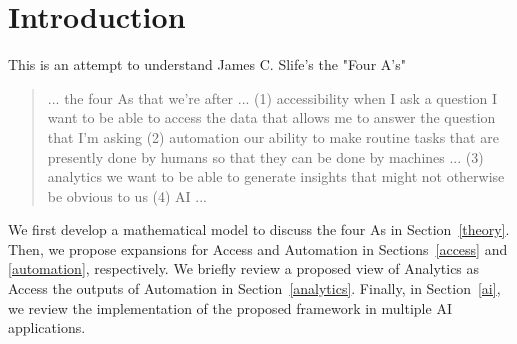 \section{Introduction}\label{intro}

This is an attempt to understand James C. Slife's the "Four A's"~\cite{Slife24}
%
\begin{quote}
... the four As that we're after ... (1) accessibility when I ask a question I want to be able to access the data that allows me to answer the question that I'm asking (2) automation our ability to make routine tasks that are presently done by humans so that they can be done by machines ... (3) analytics we want to be able to generate insights that might not otherwise be obvious to us (4) AI ...
\end{quote}
%
We first develop a mathematical model to discuss the four As in Section~\ref{theory}. Then, we propose expansions for Access and Automation in Sections~\ref{access} and \ref{automation}, respectively. We briefly review a proposed view of Analytics as Access the outputs of Automation in Section~\ref{analytics}. Finally, in Section~\ref{ai}, we review the implementation of the proposed framework in multiple AI applications.


